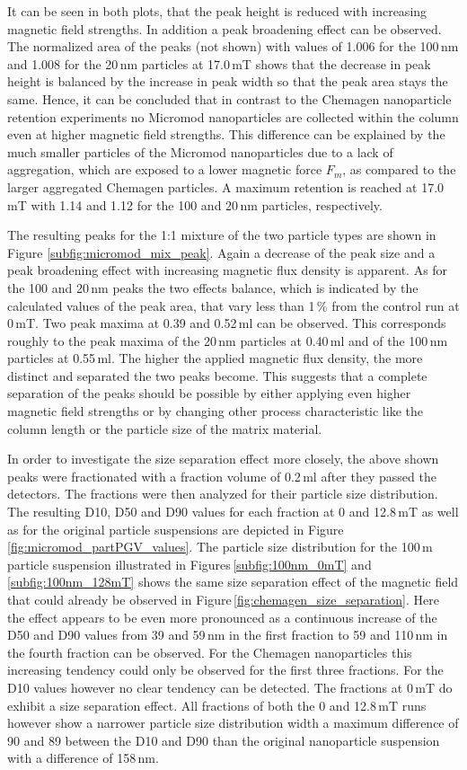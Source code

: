 It can be seen in both plots, that the peak height is reduced with increasing magnetic field strengths. In addition a peak broadening effect can be observed. The normalized area of the peaks (not shown) with values of 1.006 for the 100\,nm and 1.008 for the 20\,nm particles at 17.0\,mT shows that the decrease in peak height is balanced by the increase in peak width so that the peak area stays the same. Hence, it can be concluded that in contrast to the Chemagen nanoparticle retention experiments no Micromod nanoparticles are collected within the column even at higher magnetic field strengths. This difference can be explained by the much smaller particles of the Micromod nanoparticles due to a lack of aggregation, which are exposed to a lower magnetic force $F_{m}$, as compared to the larger aggregated Chemagen particles. A maximum retention is reached at 17.0\,mT with 1.14 and 1.12 for the 100 and 20\,nm particles, respectively.

The resulting peaks for the 1:1 mixture of the two particle types are shown in Figure \ref{subfig:micromod_mix_peak}. Again a decrease of the peak size and a peak broadening effect with increasing magnetic flux density is apparent. As for the 100 and 20\,nm peaks the two effects balance, which is indicated by the calculated values of the peak area, that vary less than 1\,\% from the control run at 0\,mT. Two peak maxima at 0.39 and 0.52\,ml can be observed. This corresponds roughly to the peak maxima of the 20\,nm particles at 0.40\,ml and of the 100\,nm particles at 0.55\,ml. The higher the applied magnetic flux density, the more distinct and separated the two peaks become. This suggests that a complete separation of the peaks should be possible by either applying even higher magnetic field strengths or by changing other process characteristic like the column length or the particle size of the matrix material.
     
In order to investigate the size separation effect more closely, the above shown peaks were fractionated with a fraction volume of 0.2\,ml after they passed the detectors. The fractions were then analyzed for their particle size distribution.  The resulting D10, D50 and D90 values for each fraction at 0 and 12.8\,mT as well as for the original particle suspensions are depicted in Figure\,\ref{fig:micromod_partPGV_values}. The particle size distribution for the 100\,m particle suspension illustrated in Figures\,\ref{subfig:100nm_0mT} and \ref{subfig:100nm_128mT} shows the same size separation effect of the magnetic field that could already be observed in Figure\,\ref{fig:chemagen_size_separation}. Here the effect appears to be even more pronounced as a continuous increase of the D50 and D90 values from 39 and 59\,nm in the first fraction to 59 and 110\,nm in the fourth fraction can be observed. For the Chemagen nanoparticles this increasing tendency could only be observed for the first three fractions. For the D10 values however no clear tendency can be detected. The fractions at 0\,mT do exhibit a size separation effect. All fractions of both the 0 and 12.8\,mT runs however show a narrower particle size distribution width a maximum difference of 90 and 89 between the D10 and D90 than the original nanoparticle suspension with a difference of 158\,nm.

